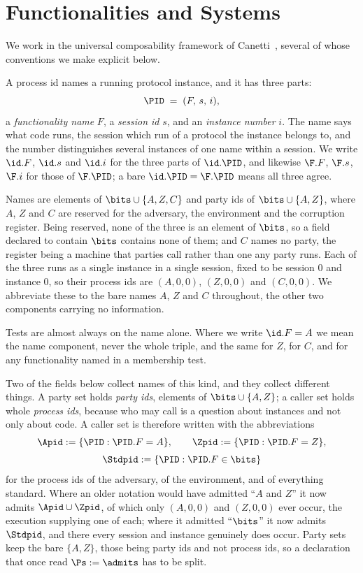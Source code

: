 \documentclass[10pt,oneside,openany]{book}
\theoremstyle{accentdef}
\theoremstyle{accentplain}
\begin{document}
\chapter{Functionalities and Systems}\label{sec:functionalities}

We work in the universal composability framework of Canetti~\cite{Canetti20}, several of whose
conventions we make explicit below.

A process id names a running protocol instance, and it has three parts:
\[
  \PID \;=\; (F,\, s,\, i) ,
\]
a \emph{functionality name} $F$, a \emph{session id} $s$, and an \emph{instance number} $i$. The
name says what code runs, the session which run of a protocol the instance belongs to, and the
number distinguishes several instances of one name within a session. We write $\id.F$,
$\id.s$ and $\id.i$ for the three parts of $\id.\PID$, and likewise $\F.F$, $\F.s$, $\F.i$ for
those of $\F.\PID$; a bare $\id.\PID = \F.\PID$ means all three agree.

Names are elements of $\bits \cup \{A,Z,C\}$ and party ids of $\bits \cup \{A,Z\}$, where $A$, $Z$
and $C$ are reserved for the adversary, the environment and the corruption register. Being
reserved, none of the three is an element of $\bits$, so a field declared to contain $\bits$
contains none of them; and $C$ names no party, the register being a machine that parties call
rather than one any party runs. Each of the three runs as a single instance in a single session,
fixed to be session $0$ and instance $0$, so their process ids are $(A,0,0)$,
$(Z,0,0)$ and $(C,0,0)$. We abbreviate these to the bare names $A$, $Z$ and $C$ throughout, the
other two components carrying no information.

Tests are almost always on the name alone. Where we write $\id.F = A$ we mean the name component,
never the whole triple, and the same for $Z$, for $C$, and for any functionality named in a
membership test.

Two of the fields below collect names of this kind, and they collect different things. A party set holds \emph{party ids}, elements of $\bits \cup \{A,Z\}$; a caller set holds
whole \emph{process ids}, because who may call is a question about instances and not only about
code. A caller set is therefore written with the abbreviations
\[
  \begin{gathered}
  \Apid := \{\PID : \PID.F = A\}, \qquad
  \Zpid := \{\PID : \PID.F = Z\}, \\[3pt]
  \Stdpid := \{\PID : \PID.F \in \bits\}
  \end{gathered}
\]
for the process ids of the adversary, of the environment, and of everything standard. Where an
older notation would have admitted ``$A$ and $Z$'' it now admits $\Apid \cup \Zpid$, of which only
$(A,0,0)$ and $(Z,0,0)$ ever occur, the execution supplying one of each; where it admitted
``$\bits$'' it now admits $\Stdpid$, and there every session and instance genuinely does occur. Party sets keep the
bare $\{A,Z\}$, those being party ids and not process ids, so a declaration that once read
$\Ps := \admits$ has to be split.
\end{document}
